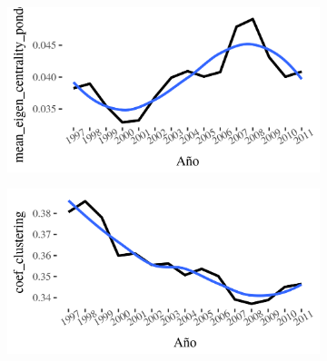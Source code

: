 \documentclass[runningheads,a4paper]{llncs}
\begin{document}
\begin{figure}%
\centering
\begin{subfigure}{.45\linewidth}
\label{fig:caracteristicas_yr-a}%
\includegraphics[width=\linewidth]{mean_eigen_centrality_ponderado_x_yr}%
\end{subfigure}%
\begin{subfigure}{.45\linewidth}
\label{fig:caracteristicas_yr-b}%
\includegraphics[width=\linewidth]{coef_clustering_x_yr}%
\end{subfigure}%
\caption[]{}%
\label{fig:caracteristicas_yr}%
\end{figure}
\end{document}
